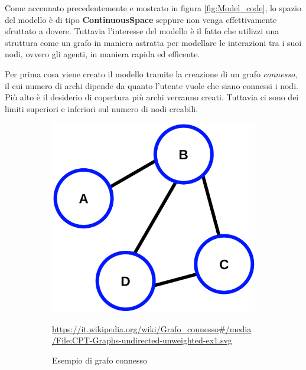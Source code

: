 Come accennato precedentemente e mostrato in figura \ref{fig:Model_code}, lo spazio del modello 
è di tipo \textbf{ContinuousSpace} seppure non venga effettivamente sfruttato a dovere. 
Tuttavia l'interesse del modello è il fatto che utilizzi una struttura come un grafo in maniera
astratta per modellare le interazioni tra i suoi nodi, ovvero gli agenti, in maniera rapida ed efficente.

Per prima cosa viene creato il modello tramite la creazione di un grafo \emph{connesso}, il cui 
numero di archi dipende da quanto l'utente vuole che siano connessi i nodi. Più alto è il 
desiderio di copertura più archi verranno creati. Tuttavia ci sono dei limiti superiori e inferiori 
sul numero di nodi creabili.

\begin{figure}[!hb]
	\centering
	\begin{subfigure}[b]{0.45\textwidth}
		\centering
		\includegraphics[width=\textwidth]{img/CPT-Graphs-undirected-unweighted-ex1.svg.png}
		\caption{Esempio di grafo connesso}
		\url{https://it.wikipedia.org/wiki/Grafo_connesso#/media/File:CPT-Graphs-undirected-unweighted-ex1.svg}
		\label{fig:connected_graph_example}
	\end{subfigure}
	\hfill
	\begin{subfigure}[b]{0.45\textwidth}
		\centering

\end{subfigure}
\end{figure}
